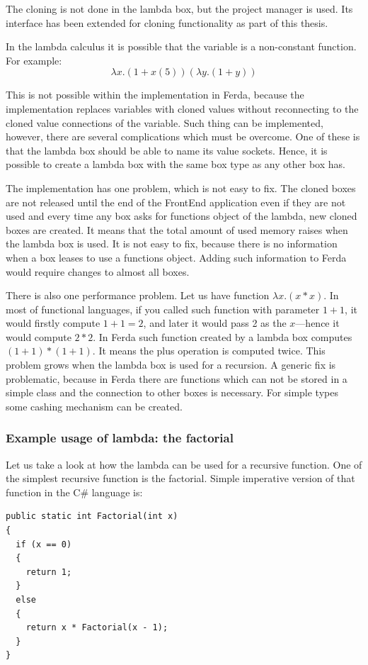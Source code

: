 \documentclass[a4paper,12pt]{book}
\begin{document}
The cloning is not done in the lambda box, but the project manager is used. Its interface has been extended for cloning functionality as part of this thesis.

In the lambda calculus it is possible that the variable is a non-constant function. For example:
\begin{equation}
\lambda x.(1+x(5))(\lambda y.(1+y))
\end{equation}

This is not possible within the implementation in Ferda, because the implementation replaces variables with cloned values without reconnecting to the cloned value connections of the variable. Such thing can be implemented, however, there are several complications which must be overcome. One of these is that the lambda box should be able to name its value sockets. Hence, it is possible to create a lambda box with the same box type as any other box has.

The implementation has one problem, which is not easy to fix. The cloned boxes are not released until the end of the FrontEnd application even if they are not used and every time any box asks for functions object of the lambda, new cloned boxes are created. It means that the total amount of used memory raises when the lambda box is used. It is not easy to fix, because there is no information when a box leases to use a functions object. Adding such information to Ferda would require changes to almost all boxes.

There is also one performance problem. Let us have function $\lambda x.(x*x)$. In most of functional languages, if you called such function with parameter $1+1$, it would firstly compute $1+1=2$, and later it would pass 2 as the $x$---hence it would compute $2*2$. In Ferda such function created by a lambda box computes $(1+1)*(1+1)$. It means the plus operation is computed twice. This problem grows when the lambda box is used for a recursion. A generic fix is problematic, because in Ferda there are functions which can not be stored in a simple class and the connection to other boxes is necessary. For simple types some cashing mechanism can be created.

\subsubsection{Example usage of lambda: the factorial}
Let us take a look at how the lambda can be used for a recursive function. One of the simplest recursive function is the factorial. Simple imperative version of that function in the C\# language is: 
\begin{verbatim}
public static int Factorial(int x)
{
  if (x == 0)
  {
    return 1;
  }
  else
  {
    return x * Factorial(x - 1);
  }
}
\end{verbatim}
	
\end{document}
